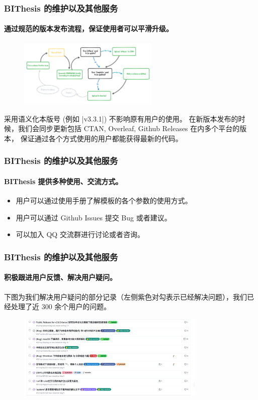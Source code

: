 \documentclass[
  aspectratio=169,
  presentation,
  titlegraphic=./images/bit.png,
  framelogo=./images/bit.png
]{bitbeamer}
\begin{document}
\begin{frame}[c]
  \frametitle{BIThesis 的维护以及其他服务}
  \framesubtitle{通过规范的版本发布流程，保证使用者可以平滑升级。}

\begin{figure}
  \begin{center}
    \includegraphics[width=0.6\textwidth]{images/release_workflow.png}
  \end{center}
\end{figure}

采用语义化本版号 (例如 |v3.3.1|) 不影响原有用户的使用。
在新版本发布的时候，我们会同步更新包括 CTAN, Overleaf, Github Releases 在内多个平台的版本，
保证通过各个方式使用的用户都能获得最新的代码。

\end{frame}

\begin{frame}[c]
  \frametitle{BIThesis 的维护以及其他服务}
  \framesubtitle{BIThesis 提供多种使用、交流方式。}

  \begin{itemize}
    \item 用户可以通过使用手册了解模板的各个参数的使用方式。
    \item 用户可以通过 Github Issues 提交 Bug 或者建议。
    \item 可以加入 QQ 交流群进行讨论或者咨询。
  \end{itemize}
\end{frame}

\begin{frame}[c]
\frametitle{BIThesis 的维护以及其他服务}
\framesubtitle{积极跟进用户反馈、解决用户疑问。}
下图为我们解决用户疑问的部分记录（左侧紫色对勾表示已经解决问题），我们已经处理了近 300 余个用户的问题。
  \begin{figure}
    \begin{center}
      \includegraphics[width=0.8\textwidth]{images/8.png}
    \end{center}
  \end{figure}
\end{frame}
\end{document}
